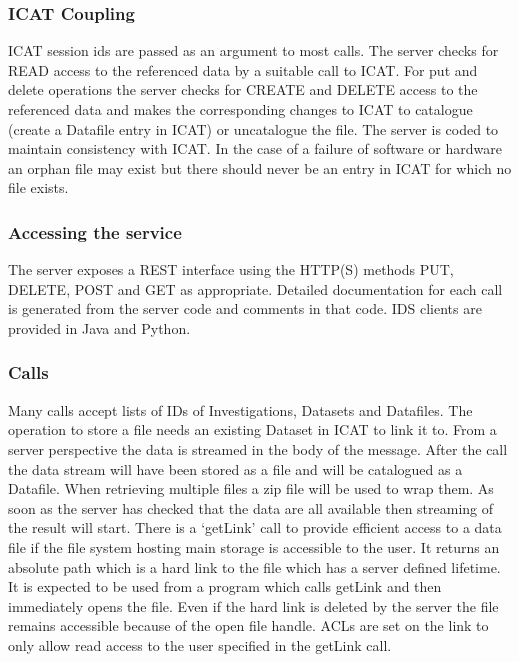 \documentclass[a4paper]{jpconf}
\begin{document}
\subsubsection{ICAT Coupling}
ICAT session ids are passed as an argument to most calls. The server
checks for READ access to the referenced data by a suitable call to
ICAT. For put and delete operations the server checks for CREATE and
DELETE access to the referenced data and makes the corresponding
changes to ICAT to catalogue (create a Datafile entry in ICAT) or
uncatalogue the file. The server is coded to maintain consistency with
ICAT. In the case of a failure of software or hardware an orphan file
may exist but there should never be an entry in ICAT for which no file
exists.

\subsubsection{Accessing the service}
The server exposes a REST interface using the HTTP(S) methods PUT,
DELETE, POST and GET as appropriate. Detailed documentation for each
call is generated from the server code and comments in that code.  IDS
clients are provided in Java and Python.

\subsubsection{Calls}
Many calls accept lists of IDs of Investigations, Datasets and
Datafiles. The operation to store a file needs an existing Dataset in
ICAT to link it to. From a server perspective the data is streamed in
the body of the message. After the call the data stream will have been
stored as a file and will be catalogued as a Datafile.  When
retrieving multiple files a zip file will be used to wrap them.  As
soon as the server has checked that the data are all available then
streaming of the result will start. There is a `getLink' call to
provide efficient access to a data file if the file system hosting
main storage is accessible to the user. It returns an absolute path
which is a hard link to the file which has a server defined
lifetime. It is expected to be used from a program which calls getLink
and then immediately opens the file. Even if the hard link is deleted
by the server the file remains accessible because of the open file
handle. ACLs are set on the link to only allow read access to the user
specified in the getLink call.
\end{document}
